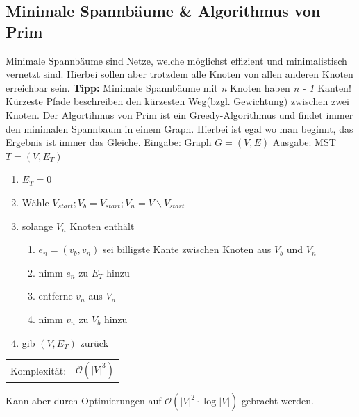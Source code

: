 \documentclass[12pt,a4paper]{article}
\begin{document}
\subsection{Minimale Spannbäume \& Algorithmus von Prim}
Minimale Spannbäume sind Netze, welche möglichst effizient und minimalistisch vernetzt sind. Hierbei sollen aber trotzdem alle Knoten von allen anderen Knoten erreichbar sein. \textbf{Tipp:} Minimale Spannbäume mit \textit{n} Knoten haben \textit{n - 1} Kanten! \newline
Kürzeste Pfade beschreiben den kürzesten Weg(bzgl. Gewichtung) zwischen zwei Knoten.\newline
\newline
Der Algortihmus von Prim ist ein Greedy-Algorithmus und findet immer den minimalen Spannbaum in einem Graph. Hierbei ist egal wo man beginnt, das Ergebnis ist immer das Gleiche.\newline
Eingabe: Graph $G = (V, E)$\newline
Ausgabe: MST $T = (V, E_T)$
\begin{enumerate}
	\item $E_T=0$
	\item Wähle $V_{start}; V_b = {V_{start}}; V_n = V \backslash {V_{start}}$
	\item solange $V_n$ Knoten enthält
	\begin{enumerate}
		\item $e_n = (v_b, v_n)$ sei billigste Kante zwischen Knoten aus $V_b$ und $V_n$
		\item nimm $e_n$ zu $E_T$ hinzu
		\item entferne $v_n$ aus $V_n$
		\item nimm $v_n$ zu $V_b$ hinzu 
	\end{enumerate}
	\item gib $(V, E_T)$ zurück
\end{enumerate}
\begin{tabularx}{\textwidth}{l l}
	Komplexität: &$\mathcal{O}(|V|^3)$\\
\end{tabularx}
Kann aber durch Optimierungen auf $\mathcal{O}(|V|^2 \cdot \log |V|)$ gebracht werden.
\end{document}
